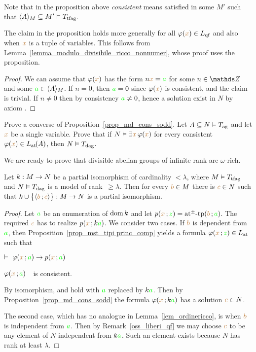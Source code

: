 \documentclass[creche.tex]{subfiles}
\begin{document}
Note that in the proposition above  \textit{consistent\/} means satisfied in some $M'$ such that $\<A\>_M\subseteq M'\models T_{\rm tfag}$.

The claim in the proposition holds more generally for all $\phi({\mr x})\in L_{\rm qf}$ and also when ${\mr x}$ is a tuple of variables. This follows from Lemma~\ref{lemma_modulo_divisibile_ricco_nonnumer}, whose proof uses the proposition.

\begin{proof}
We can assume that $\phi({\mr x})$ has the form $n {\mr x}= {\gr a}$ for some $n\in\ZZ$ and some ${\gr a}\in\<A\>_M$. If $n=0$, then ${\gr a}=0$ since $\phi({\mr x})$ is consistent, and the claim is trivial. If $n\neq0$ then by consistency ${\gr a}\neq0$, hence a solution exist in $N$ by axiom .
\end{proof}

\begin{exercise}
Prove a converse of Proposition~\ref{prop_md_cons_sodd}. Let $A\subseteq N\models T_{\rm ag}$ and let ${\mr x}$ be a single variable. Prove that if $N\models\E{\mr x} \,\phi({\mr x})$ for every consistent $\phi({\mr x})\in\atL(A)$, then $N\models T_{\rm dag}$.\QED
\end{exercise}

We are ready to prove that divisible abelian groups of infinite rank are $\omega$-rich.

\begin{lemma}\label{lemma_modulo_divisibile_ricco_nonnumer}
Let $k:M\imp N$ be a partial isomorphism of cardinality $<\lambda$, where $M\models T_{\rm tfag}$ and $N\models T_{\rm dag}$ is a model of rank $\ \ge\lambda$. Then for every ${\mr b}\in M$ there is ${\mr c}\in N$ such that $k\cup\big\{\<{\mr b}\,;{\mr c}\>\big\}:M\imp N$ is a partial isomorphism.
\end{lemma}

\begin{proof}
Let ${\gr a}$ be an enumeration of $\dom k$ and let $p({\mr x}\,;{\gr z})=\atpmtp({\mr b}\,;{\gr a})$.  The required ${\mr c}$ has to realize $p({\mr x}\,;k{\gr a})$. We consider two cases. If ${\mr b}$ is dependent from ${\gr a}$, then Proposition~\ref{prop_mst_tipi princ_comp} yields a formula $\phi({\mr x}\,;{\gr z})\in\atL$ such that 

\noindent{}\hspace{5ex} $\proves\ \phi({\mr x}\,;{\gr a})\imp p({\mr x}\,;{\gr a})$

\noindent{}\hspace{5ex} $\phi({\mr x}\,;{\gr a})$\ \ is consistent.

By isomorphism,   and  hold with ${\gr a}$ replaced by $k{\gr a}$. Then by Proposition~\ref{prop_md_cons_sodd} the formula $\phi({\mr x}\,;k{\gr a})$ has a solution ${\mr c} \in N$.

The second case, which has no analogue in Lemma~\ref{lem_ordinericco}, is when ${\mr b}$ is independent from ${\gr a}$. Then by   Remark~\ref{oss_liberi_qf} we may choose ${\mr c}$ to be any element of $N$ independent from $k{\gr a}$. Such an element exists because $N$ has rank at least $\lambda$. 
\end{proof}
\end{document}
